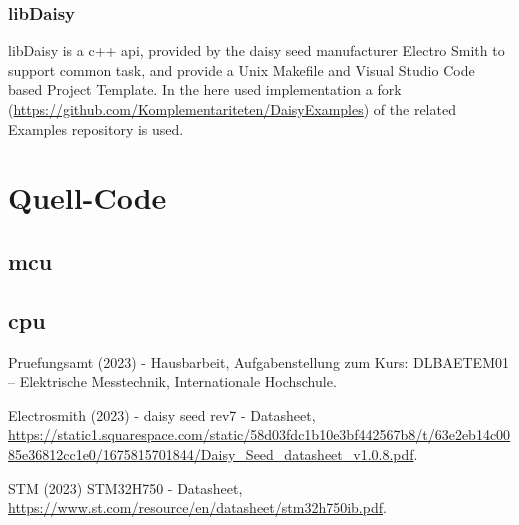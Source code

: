 \documentclass{report}
\begin{document}
\subsection{libDaisy}
libDaisy is a c++ api, provided by the daisy seed manufacturer Electro Smith to support common task, and provide a Unix Makefile and Visual Studio Code based Project Template. In the here used implementation a fork (\url{https://github.com/Komplementariteten/DaisyExamples}) of the related Examples repository is used.

\appendix
\chapter{Quell-Code}
\section{mcu}

\section{cpu}

\begin{thebibliography}{9}
Pruefungsamt (2023) - Hausbarbeit, Aufgabenstellung zum Kurs: DLBAETEM01 – Elektrische Messtechnik, Internationale Hochschule.

Electrosmith (2023) - daisy seed rev7 - Datasheet, \url{https://static1.squarespace.com/static/58d03fdc1b10e3bf442567b8/t/63e2eb14c0085e36812cc1e0/1675815701844/Daisy_Seed_datasheet_v1.0.8.pdf}.

STM (2023) STM32H750 - Datasheet, \url{https://www.st.com/resource/en/datasheet/stm32h750ib.pdf}.

\end{thebibliography}
\end{document}
